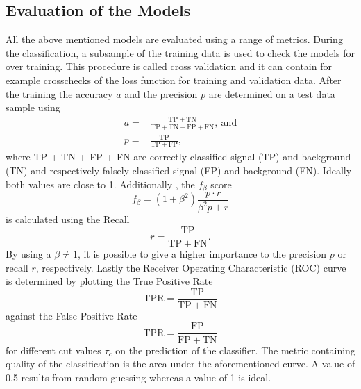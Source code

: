 \subsection{Evaluation of the Models}
All the above mentioned models are evaluated using a range of metrics. During the classification, a subsample of the training data is used to check the models for over training. This procedure is called cross validation and it can contain for example crosschecks of the loss function for training and validation data. After the training the accuracy $a$ and the precision $p$ are determined on a test data sample using 
\begin{align*}
	a =& \frac{\mathrm{TP + TN}}{\mathrm{TP + TN + FP + FN}},\ \mathrm{and}\\
	p=&  \frac{\mathrm{TP}}{\mathrm{TP + FP}},
\end{align*}
where TP + TN + FP + FN are correctly classified signal (TP) and background (TN) and respectively falsely classified signal (FP) and background (FN). Ideally both values are close to 1. 
Additionally , the $f_\beta$ score
\begin{equation}
	f_\beta = (1+\beta^2) \frac{p\cdot r}{\beta^2p+r}
\end{equation}
is calculated using the Recall
\begin{equation*}
r = \frac{\mathrm{TP}}{\mathrm{TP + FN}}.
\end{equation*}
By using a $\beta \neq 1$, it is possible to give a higher importance to the precision $p$ or recall $r$, respectively.
Lastly the Receiver Operating Characteristic (ROC) curve is determined by plotting the True Positive Rate 
\begin{equation*}
	\mathrm{TPR} = \frac{\mathrm{TP}}{\mathrm{TP + FN}}
\end{equation*}
against the False Positive Rate 
\begin{equation*}
	\mathrm{TPR} = \frac{\mathrm{FP}}{\mathrm{FP + TN}}
\end{equation*}
for different cut values $\tau_c$ on the prediction of the classifier. The metric containing quality of the classification is the area under the aforementioned curve. A value of 0.5 results from random guessing whereas a value of 1 is ideal.









